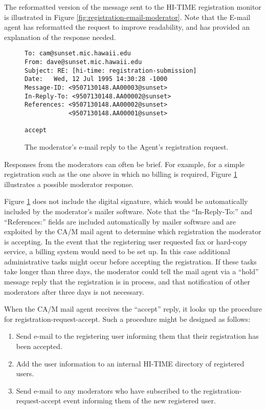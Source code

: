 The reformatted version of the message sent to the HI-TIME registration
monitor is illustrated in Figure \ref{fig:registration-email-moderator}.
Note that the E-mail agent has reformatted the request to improve
readability, and has provided an explanation of the response needed.


\begin{figure}
\small\begin{verbatim}
To: cam@sunset.mic.hawaii.edu
From: dave@sunset.mic.hawaii.edu
Subject: RE: [hi-time: registration-submission]
Date: 	Wed, 12 Jul 1995 14:30:28 -1000
Message-ID: <9507130148.AA00003@sunset>
In-Reply-To: <9507130148.AA00002@sunset>
References: <9507130148.AA00002@sunset>
            <9507130148.AA00001@sunset>

accept
\end{verbatim}
\caption{The moderator's e-mail reply to the Agent's registration request.}
\label{fig:registration-email-reply}
\end{figure}

Responses from the moderators can often be brief.  For example, for 
a simple registration such as the one above in which no billing is
required, Figure \ref{fig:registration-email-reply} 
illustrates a possible moderator response. 

Figure \ref{fig:registration-email-reply} does not include the digital
signature, which would be automatically included by the moderator's mailer
software.  Note that the ``In-Reply-To:'' and ``References:'' fields are
included automatically by mailer software and are exploited by the CA/M mail
agent to determine which registration the moderator is accepting.  In the
event that the registering user requested fax or hard-copy service, a
billing system would need to be set up.  In this case additional
administrative tasks might occur before accepting the registration.  If
these tasks take longer than three days, the moderator could tell the mail
agent via a ``hold'' message reply that the registration is in process, and
that notification of other moderators after three days is not necessary.

When the CA/M mail agent receives the ``accept'' reply, it looks up the 
procedure for registration-request-accept.  Such a procedure might be 
designed as follows:

\begin{enumerate}
\item Send e-mail to the registering user informing them that their 
      registration has been accepted.
\item Add the user information to an internal HI-TIME directory of
      registered users.
\item Send e-mail to any moderators who have subscribed to the 
      registration-request-accept event informing them of the new
      registered user.
\end{enumerate}

